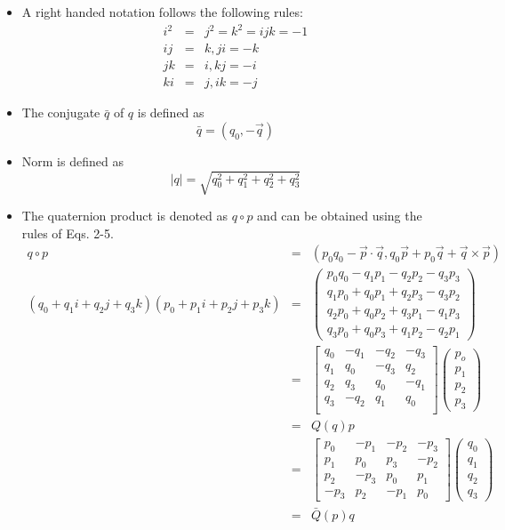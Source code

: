 \documentclass{article}
\begin{document}
	\begin{itemize}
		\item A right handed notation follows the following rules:
		\begin{eqnarray}		
		i^2 &=& j^2 = k^2 = ijk = -1\\
		ij &=& k, ji = -k\\
		jk &=& i, kj = -i\\
		ki &=& j, ik = -j
		\end{eqnarray}
		
		\item The conjugate $\bar{q}$ of $q$ is defined as 
		\begin{equation}
		\bar{q} = (q_0,-\vec{q})
		\end{equation}
		
		\item Norm is defined as
		\begin{equation}
		|q| = \sqrt{q_0^2 + q_1^2 + q_2^2 + q_3^2}
		\end{equation}
		
		\item The quaternion product is denoted as $q\circ p$ and can be obtained using the rules of Eqs. 2-5.
		\begin{eqnarray}
		q\circ p &=& (p_0q_0-\vec{p}\cdot\vec{q},q_0\vec{p}+p_0\vec{q}+\vec{q}\times\vec{p})\\
		(q_0 + q_1i + q_2j + q_3k)(p_0 + p_1i + p_2j + p_3k)
		&=&\begin{pmatrix}
		p_0q_0 - q_1p_1 - q_2p_2 - q_3p_3\\
		q_1p_0 + q_0p_1 + q_2p_3 - q_3p_2\\
		q_2p_0 + q_0p_2 + q_3p_1 - q_1p_3\\
		q_3p_0 + q_0p_3 + q_1p_2 - q_2p_1
		\end{pmatrix}\\			
		&=& \begin{bmatrix}
		q_0 &-q_1 &-q_2& -q_3\\
		q_1 &q_0 &-q_3& q_2\\
		q_2 &q_3& q_0 &-q_1\\
		q_3 &-q_2& q_1 &q_0\\
		\end{bmatrix}\begin{pmatrix}
		p_o\\p_1\\p_2\\p_3
		\end{pmatrix}\\
		&=& Q(q)p\\			
		&=& \begin{bmatrix}
		p_0 &-p_1& -p_2& -p_3\\
		p_1 &p_0& p_3 &-p_2\\
		p_2 &-p_3& p_0 &p_1\\
		-p_3& p_2 &-p_1 &p_0
		\end{bmatrix}\begin{pmatrix}
		q_0\\q_1\\q_2\\q_3
		\end{pmatrix}\\			
		&=& \bar{Q}(p)q
		\end{eqnarray}
		

\end{itemize}
\end{document}
